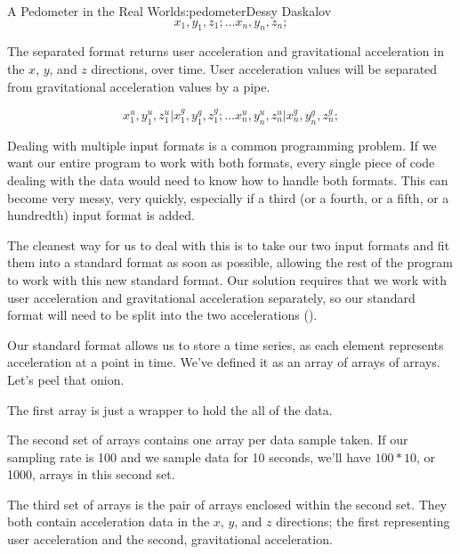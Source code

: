 \begin{aosachapter}{A Pedometer in the Real World}{s:pedometer}{Dessy Daskalov}
\[
x_1,y_1,z_1; \ldots x_n,y_n,z_n;
\]

\label{separated-format}

The separated format returns user acceleration and gravitational
acceleration in the $x$, $y$, and $z$ directions, over time. User
acceleration values will be separated from gravitational acceleration
values by a pipe.

\[
x^{u}_1,y^{u}_1,z^{u}_1 \vert x^{g}_1,y^{g}_1,z^{g}_1; \ldots x^{u}_n,y^{u}_n,z^{u}_n \vert x^{g}_n,y^{g}_n,z^{g}_n;
\]

\label{i-got-multiple-input-formats-but-a-standard-aint-one}

Dealing with multiple input formats is a common programming problem. If
we want our entire program to work with both formats, every single piece
of code dealing with the data would need to know how to handle both
formats. This can become very messy, very quickly, especially if a third
(or a fourth, or a fifth, or a hundredth) input format is added.

\label{standard-format}

The cleanest way for us to deal with this is to take our two input
formats and fit them into a standard format as soon as possible,
allowing the rest of the program to work with this new standard format.
Our solution requires that we work with user acceleration and
gravitational acceleration separately, so our standard format will need
to be split into the two accelerations
().


Our standard format allows us to store a time series, as each element
represents acceleration at a point in time. We've defined it as an array
of arrays of arrays. Let's peel that onion.

\begin{aosaitemize}

\item
  The first array is just a wrapper to hold the all of the data.
\item
  The second set of arrays contains one array per data sample taken. If
  our sampling rate is 100 and we sample data for 10 seconds, we'll have
  $100 * 10$, or 1000, arrays in this second set.
\item
  The third set of arrays is the pair of arrays enclosed within the
  second set. They both contain acceleration data in the $x$, $y$, and
  $z$ directions; the first representing user acceleration and the
  second, gravitational acceleration.
\end{aosaitemize}


\end{aosachapter}
